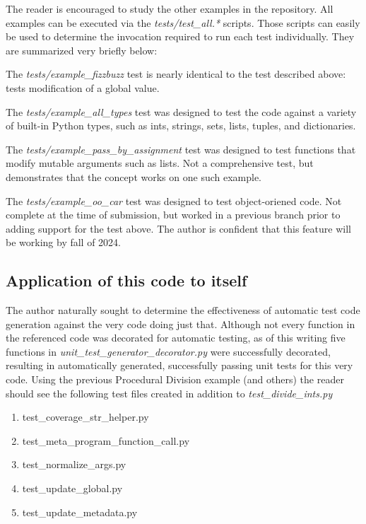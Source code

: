 The reader is encouraged to study the other examples in the repository.
All examples can be executed via the 
\textit{tests/test\_all.*} scripts.  Those
scripts can easily be used to determine the invocation required to run each 
test individually.  They are summarized very briefly below:

The \textit{tests/example\_fizzbuzz} test is nearly identical to the 
test described above: tests modification of a global value.

The \textit{tests/example\_all\_types} test was designed to test
the code against a variety of built-in Python types, 
such as ints, strings, sets, lists, tuples, and dictionaries.

The \textit{tests/example\_pass\_by\_assignment} test was designed to test
functions that modify mutable arguments such as lists. Not a comprehensive test,
but demonstrates that the concept works on one such example.

The \textit{tests/example\_oo\_car} test was designed to test
object-oriened code. Not complete at the time of submission, but worked in a 
previous branch prior to adding support for the test above.
The author is confident that this feature will be working by 
fall of 2024.
%
\subsection{Application of this code to itself}\label{sec:eval-2}

The author naturally sought to determine the effectiveness of automatic
test code generation against the very code doing just that.  Although not 
every function in the referenced code was decorated for automatic testing, 
as of this writing five functions in 
\textit{unit\_test\_generator\_decorator.py} were successfully decorated, 
resulting in automatically generated, successfully passing unit tests for this
very code.  Using the previous Procedural Division example (and others) 
the reader should see the following test files created in addition to 
\textit{test\_divide\_ints.py}

\begin{enumerate}
    \item test\_coverage\_str\_helper.py
    \item test\_meta\_program\_function\_call.py
    \item test\_normalize\_args.py
    \item test\_update\_global.py
    \item test\_update\_metadata.py
\end{enumerate}

